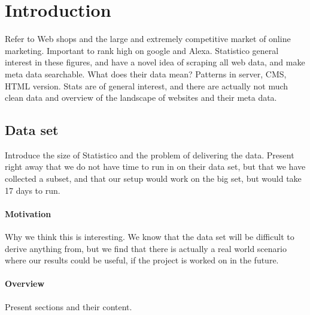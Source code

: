 \section{Introduction}
\label{sec:introduction}

Refer to Web shops and the large and extremely competitive market of online marketing.
Important to rank high on google and Alexa.
Statistico general interest in these figures, and have a novel idea of scraping all web data, and make meta data searchable. What does their data mean? Patterns in server, CMS, HTML version. Stats are of general interest, and there are actually not much clean data and overview of the landscape of websites and their meta data.

\subsection{Data set}
\label{subsec:data_set}
Introduce the size of Statistico and the problem of delivering the data. Present right away that we do not have time to run in on their data set, but that we have collected a subset, and that our setup would work on the big set, but would take 17 days to run.

\paragraph{Motivation}
Why we think this is interesting. We know that the data set will be difficult to derive anything from, but we find that there is actually a real world scenario where our results could be useful, if the project is worked on in the future.

\paragraph{Overview}
Present sections and their content.

